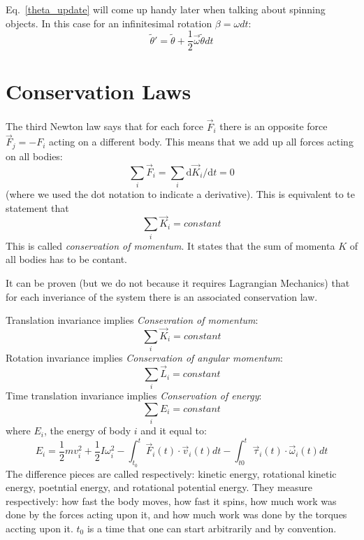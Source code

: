 \documentclass[12pt]{article}
\begin{document}
Eq.~\ref{theta_update} will come up handy later when talking about spinning objects. In this case for an infinitesimal rotation $\beta=\omega dt$:
\begin{equation}
\tilde \theta' = \tilde \theta + \frac{1}{2}\vec \omega \tilde \theta dt
\end{equation}

\section{Conservation Laws}

The third Newton law says that for each force $\vec F_i$ there is an opposite force $\vec F_j = -F_i$ acting on a different body. This means that we add up all forces acting on all bodies:
\begin{equation}
\sum_i \vec F_i = \sum_i \mathrm{d}\vec K_i/ \mathrm{d}t = 0
\end{equation}
(where we used the dot notation to indicate a derivative). This is equivalent to te statement that
\begin{equation}
\sum_i \vec K_i = constant
\end{equation}
This is called {\it conservation of momentum}. It states that the sum of momenta $K$ of all bodies has to be contant.

It can be proven (but we do not because it requires Lagrangian Mechanics) that for each inveriance of the system there is an associated conservation law.

Translation invariance implies {\it Consevration of momentum}: 
\begin{equation}
\sum_i \vec K_i = constant
\end{equation}
Rotation invariance implies {\it Conservation of angular momentum}:
\begin{equation}
\sum_i \vec L_i = constant
\end{equation}
Time translation invariance implies {\it Conservation of energy}:
\begin{equation}
\sum_i E_i = constant
\end{equation}
where $E_i$, the energy of body $i$ and it equal to:
\begin{equation}
E_i = \frac 12 m v_i^2 + \frac 12 I \omega_i^2 - \int_{t_0}^t \vec F_i(t) \cdot \vec v_i(t) dt
- \int_{t0}^t \vec \tau_i(t) \cdot\vec \omega_i(t) dt
\end{equation}
The difference pieces are called respectively: kinetic energy, rotational kinetic energy, poetntial energy, and rotational potential energy. They measure respectively: how fast the body moves, how fast it spins, how much work was done by the forces acting upon it, and how much work was done by the torques accting upon it. $t_0$ is a time that one can start arbitrarily and by convention.
\end{document}
